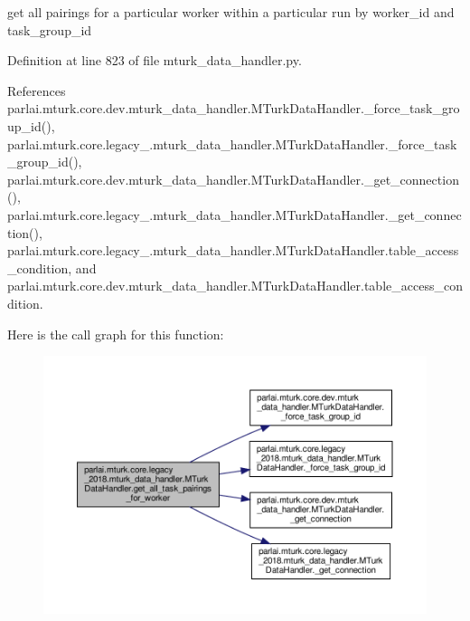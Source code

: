 \begin{DoxyVerb}get all pairings for a particular worker within a
particular run by worker_id and task_group_id
\end{DoxyVerb}
 

Definition at line 823 of file mturk\+\_\+data\+\_\+handler.\+py.



References parlai.\+mturk.\+core.\+dev.\+mturk\+\_\+data\+\_\+handler.\+M\+Turk\+Data\+Handler.\+\_\+force\+\_\+task\+\_\+group\+\_\+id(), parlai.\+mturk.\+core.\+legacy\+\_.\+mturk\+\_\+data\+\_\+handler.\+M\+Turk\+Data\+Handler.\+\_\+force\+\_\+task\+\_\+group\+\_\+id(), parlai.\+mturk.\+core.\+dev.\+mturk\+\_\+data\+\_\+handler.\+M\+Turk\+Data\+Handler.\+\_\+get\+\_\+connection(), parlai.\+mturk.\+core.\+legacy\+\_.\+mturk\+\_\+data\+\_\+handler.\+M\+Turk\+Data\+Handler.\+\_\+get\+\_\+connection(), parlai.\+mturk.\+core.\+legacy\+\_.\+mturk\+\_\+data\+\_\+handler.\+M\+Turk\+Data\+Handler.\+table\+\_\+access\+\_\+condition, and parlai.\+mturk.\+core.\+dev.\+mturk\+\_\+data\+\_\+handler.\+M\+Turk\+Data\+Handler.\+table\+\_\+access\+\_\+condition.

Here is the call graph for this function\+:
\nopagebreak
\begin{figure}[H]
\begin{center}
\leavevmode
\includegraphics[width=350pt]{classparlai_1_1mturk_1_1core_1_1legacy__2018_1_1mturk__data__handler_1_1MTurkDataHandler_ae5c1f4e4db038e23d1bd2abd6d6c35cd_cgraph}
\end{center}
\end{figure}
\mbox{\label{classparlai_1_1mturk_1_1core_1_1legacy__2018_1_1mturk__data__handler_1_1MTurkDataHandler_a3b340b130896aab223069d783566ce3e}} 
